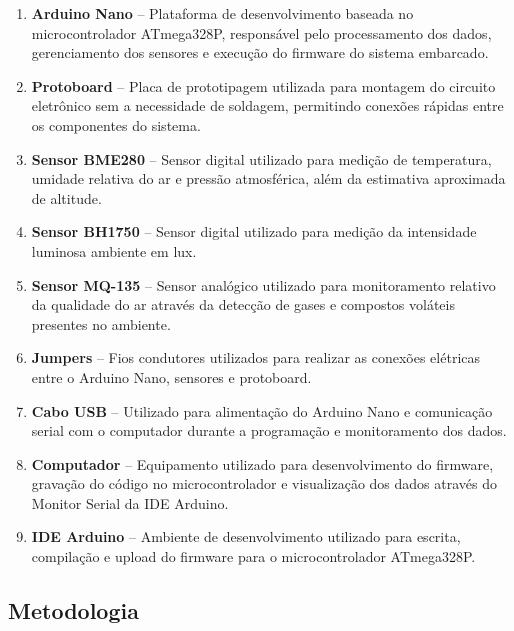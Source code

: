 \documentclass[a4paper,12pt]{article}
\begin{document}
\begin{enumerate}

    \item \textbf{Arduino Nano} -- Plataforma de desenvolvimento baseada no microcontrolador ATmega328P, responsável pelo processamento dos dados, gerenciamento dos sensores e execução do firmware do sistema embarcado.
    
    \item \textbf{Protoboard} -- Placa de prototipagem utilizada para montagem do circuito eletrônico sem a necessidade de soldagem, permitindo conexões rápidas entre os componentes do sistema.
    
    \item \textbf{Sensor BME280} -- Sensor digital utilizado para medição de temperatura, umidade relativa do ar e pressão atmosférica, além da estimativa aproximada de altitude.
    
    \item \textbf{Sensor BH1750} -- Sensor digital utilizado para medição da intensidade luminosa ambiente em lux.
    
    \item \textbf{Sensor MQ-135} -- Sensor analógico utilizado para monitoramento relativo da qualidade do ar através da detecção de gases e compostos voláteis presentes no ambiente.
    
    \item \textbf{Jumpers} -- Fios condutores utilizados para realizar as conexões elétricas entre o Arduino Nano, sensores e protoboard.
    
    \item \textbf{Cabo USB} -- Utilizado para alimentação do Arduino Nano e comunicação serial com o computador durante a programação e monitoramento dos dados.
    
    \item \textbf{Computador} -- Equipamento utilizado para desenvolvimento do firmware, gravação do código no microcontrolador e visualização dos dados através do Monitor Serial da IDE Arduino.
    
    \item \textbf{IDE Arduino} -- Ambiente de desenvolvimento utilizado para escrita, compilação e upload do firmware para o microcontrolador ATmega328P.
    
\end{enumerate}
\subsection{Metodologia}
\end{document}
